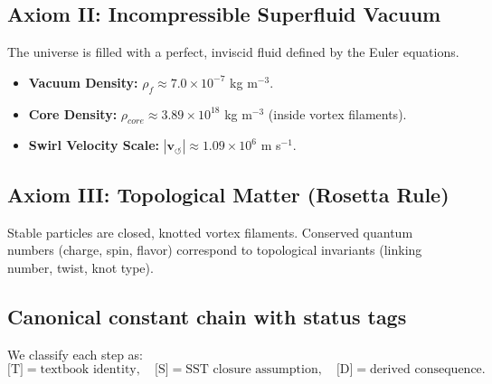 \documentclass[10pt]{article}
\newcommand{\vswirl}{\mathbf{v}_{\!\boldsymbol{\circlearrowleft}}}
\newcommand{\rhof}{\rho_{\!f}}                           %
\newcommand{\rhocore}{\rho_{core}}
\begin{document}
        \subsection*{Axiom II: Incompressible Superfluid Vacuum}
            The universe is filled with a perfect, inviscid fluid defined by the Euler equations.
            \begin{itemize}
                \item \textbf{Vacuum Density:} $\rhof \approx 7.0 \times 10^{-7}$ kg m$^{-3}$.
                \item \textbf{Core Density:} $\rhocore \approx 3.89 \times 10^{18}$ kg m$^{-3}$ (inside vortex filaments).
                \item \textbf{Swirl Velocity Scale:} $|\vswirl| \approx 1.09 \times 10^6$ m s$^{-1}$.
            \end{itemize}

        \subsection*{Axiom III: Topological Matter (Rosetta Rule)}
            Stable particles are closed, knotted vortex filaments. Conserved quantum numbers (charge, spin, flavor) correspond to topological invariants (linking number, twist, knot type).

    \subsection{Canonical constant chain with status tags}
        \label{sec:canon-constants-status}

        We classify each step as:
        \[
            \text{[T]}=\text{textbook identity},\quad
            \text{[S]}=\text{SST closure assumption},\quad
            \text{[D]}=\text{derived consequence}.
        \]
\end{document}
